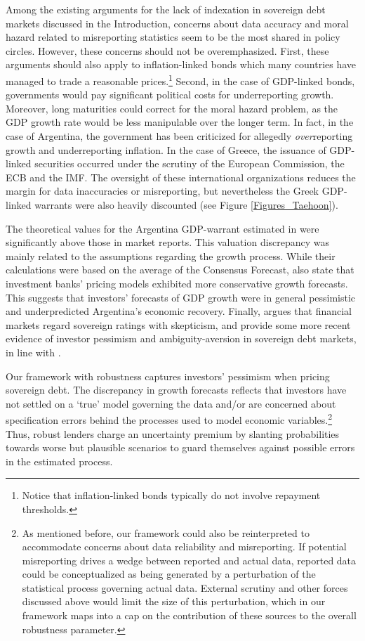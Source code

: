 Among the existing arguments for the lack of indexation in sovereign debt markets discussed in the Introduction, concerns about data accuracy and moral hazard related to misreporting statistics seem to be the most shared in policy circles. However, these concerns should not be overemphasized. First, these arguments should also apply to inflation-linked bonds which many countries have managed to trade a reasonable prices.\footnote{Notice that inflation-linked bonds typically do not involve repayment thresholds.} Second, in the case of GDP-linked bonds, governments would pay significant political costs for underreporting growth. Moreover, long maturities could correct for the moral hazard problem, as the GDP growth rate would be less manipulable over the longer term. In fact, in the case of Argentina, the government has been criticized for allegedly \emph{over}reporting growth and underreporting inflation. In the case of Greece, the issuance of GDP-linked securities occurred under the scrutiny of the European Commission, the ECB and the IMF. The oversight of these international organizations reduces the margin for data inaccuracies or misreporting, but nevertheless the Greek GDP-linked warrants were also heavily discounted (see Figure \ref{Figures_Taehoon}).

The theoretical values for the Argentina GDP-warrant estimated in \citet*{ChamonCostaRicci2008} were significantly above those in market reports. This valuation discrepancy was mainly related to the assumptions regarding the growth process. While their calculations were based on the average of the Consensus Forecast, \citet*{ChamonCostaRicci2008} also state that investment banks’ pricing models exhibited more conservative growth forecasts. This suggests that investors’ forecasts of GDP growth were in general pessimistic and underpredicted Argentina's economic recovery. Finally, \citet{CantorPacker1996} argues that financial markets regard sovereign ratings with skepticism, and \citet{GrossePodstawski2017} provide some more recent evidence of investor pessimism and ambiguity-aversion in sovereign debt markets, in line with \citet{PouzoPresno2016}.

Our framework with robustness captures investors' pessimism when pricing sovereign debt. The discrepancy in growth forecasts reflects that investors have not settled on a `true' model governing the data and/or are concerned about specification errors behind the processes used to model economic variables.\footnote{As mentioned before, our framework could also be reinterpreted to accommodate concerns about data reliability and misreporting. If potential misreporting drives a wedge between reported and actual data, reported data could be conceptualized as being generated by a perturbation of the statistical process governing actual data. External scrutiny and other forces discussed above would limit the size of this perturbation, which in our framework maps into a cap on the contribution of these sources to the overall robustness parameter.} Thus, robust lenders charge an uncertainty premium by slanting probabilities towards worse but plausible scenarios to guard themselves against possible errors in the estimated process.

